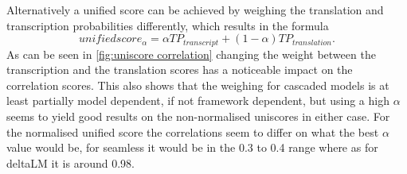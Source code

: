 Alternatively a unified score can be achieved by weighing the translation and transcription probabilities differently, which results in the formula $$unifiedscore_\alpha= \alpha TP_{transcript} + (1-\alpha)TP_{translation}.$$ 
As can be seen in \autoref{fig:uniscore correlation} changing the weight between the transcription and the translation scores has a noticeable impact on the correlation scores. 
This also shows that the weighing for cascaded models is at least partially model dependent, if not framework dependent, but using a high $\alpha$ seems to yield good results on the non-normalised uniscores in either case. 
For the normalised unified score the correlations seem to differ on what the best $\alpha$ value would be, for seamless it would be in the 0.3 to 0.4 range where as for deltaLM it is around 0.98. 

